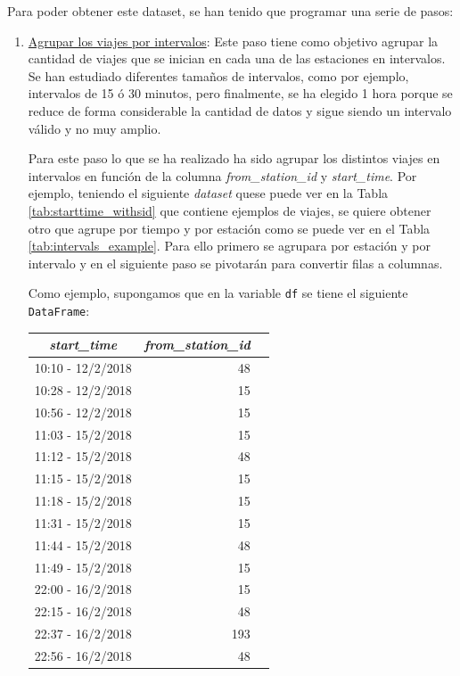 Para poder obtener este dataset, se han tenido que programar una serie de pasos:
\begin{enumerate}
    \item \underline{Agrupar los viajes por intervalos}: Este paso tiene como objetivo agrupar la cantidad de viajes que se inician en cada una de las estaciones en intervalos. Se han estudiado diferentes tamaños de intervalos, como por ejemplo, intervalos de 15 ó 30 minutos, pero finalmente, se ha elegido 1 hora porque se reduce de forma considerable la cantidad de datos y sigue siendo un intervalo válido y no muy amplio.
    \newline
    
    Para este paso lo que se ha realizado ha sido agrupar los distintos viajes en intervalos en función de la columna \textit{from\_station\_id} y \textit{start\_time}. Por ejemplo, teniendo el siguiente \textit{dataset} quese puede ver en la Tabla \ref{tab:starttime_withsid} que contiene ejemplos de viajes, se quiere obtener otro que agrupe por tiempo y por estación como se puede ver en el Tabla \ref{tab:intervals_example}. Para ello primero se agrupara por estación y por intervalo y en el siguiente paso se pivotarán para convertir filas a columnas.
    \newline
    
    Como ejemplo, supongamos que en la variable \small{\verb|df|} se tiene el siguiente \small{\verb|DataFrame|}:

    \begin{table}[H]
    \footnotesize
    \centering
    \begin{tabular}{c|rr}
        \toprule
          \textit{start\_time} & \textit{from\_station\_id}  \\
        \midrule
        
        10:10 - 12/2/2018 & 48\\
        10:28 - 12/2/2018 & 15\\
        10:56 - 12/2/2018 & 15\\
        11:03 - 15/2/2018 & 15\\
        11:12 - 15/2/2018 & 48\\
        11:15 - 15/2/2018 & 15\\
        11:18 - 15/2/2018 & 15\\
        11:31 - 15/2/2018 & 15\\
        11:44 - 15/2/2018 & 48\\
        11:49 - 15/2/2018 & 15\\
        22:00 - 16/2/2018 & 15\\
        22:15 - 16/2/2018 & 48\\
        22:37 - 16/2/2018 & 193\\
        22:56 - 16/2/2018 & 48\\
        \bottomrule
        

\end{tabular}
\end{table}
\end{enumerate}
